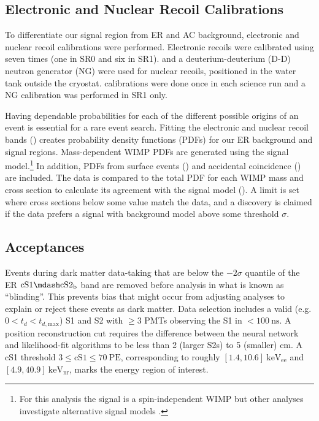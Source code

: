 \subsection{Electronic and Nuclear Recoil Calibrations}
\label{subsec:dark_matter_results_er_nr_cal}
To differentiate our signal region from ER and AC background, electronic and nuclear recoil calibrations were performed.  Electronic
recoils were calibrated using  seven times (one in SR0 and six in SR1).   and a deuterium-deuterium (D-D)
neutron generator (NG) were used for nuclear recoils, positioned in the water tank outside the cryostat.  \ambe calibrations were done
once in each science run and a NG calibration was performed in SR1 only.

Having dependable probabilities for each of the different possible origins of an event is essential for a rare event search.  Fitting the
electronic and nuclear
recoil bands () creates probability density functions (PDFs) for our ER background and signal
regions.  Mass-dependent WIMP PDFs are generated using the signal model.\footnote{For this analysis the signal is a spin-independent
WIMP but other analyses investigate alternative signal models
.}  In
addition, PDFs from surface events () and accidental coincidence
() are included.  The data is compared
to the total PDF for each WIMP mass and cross section to calculate its agreement with the signal model
().  A limit is set where
cross sections below some value match the data, and a discovery is claimed if the data prefers a signal with background model above
some threshold $\sigma$.



\subsection{Acceptances}
\label{subsec:dark_matter_results_selection}
Events during dark matter data-taking that are below the $-2 \sigma$ quantile of the ER $\mathrm{cS1} \mdash \mathrm{cS2_b}$ band are
removed before analysis in what is known as ``blinding''.  This prevents bias that might occur from adjusting analyses to explain or
reject these events as dark matter.  Data selection includes a valid (e.g. $0 < t_d < t_{d,\mathrm{max}}$) S1 and S2 with $\geq 3$ PMTs
observing the S1 in $< 100\ \mathrm{ns}$.  A position
reconstruction cut requires the difference between the neural network and likelihood-fit algorithms to be less than 2 (larger S2s) to 5
(smaller) cm.  A cS1 threshold $3 \leq \mathrm{cS1} \leq 70\ \mathrm{PE}$, corresponding to roughly
$[1.4, 10.6]\ \mathrm{keV_{ee}}$ and $[4.9, 40.9]\ \mathrm{keV_{nr}}$, marks the energy region of interest.

